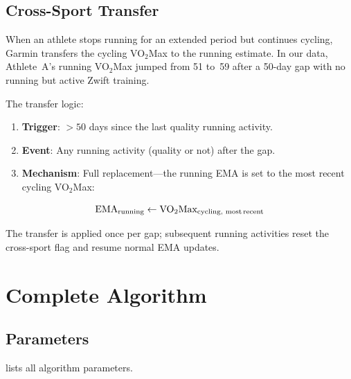 \documentclass[11pt,a4paper]{article}
\begin{document}
\subsection{Cross-Sport Transfer}
\label{sec:cross-sport}

When an athlete stops running for an extended period but continues cycling, Garmin transfers the cycling VO$_2$Max to the running estimate.
In our data, Athlete~A's running VO$_2$Max jumped from 51 to~59 after a 50-day gap with no running but active Zwift training.

The transfer logic:
\begin{enumerate}[nosep]
    \item \textbf{Trigger}: $> 50$ days since the last quality running activity.
    \item \textbf{Event}: Any running activity (quality or not) after the gap.
    \item \textbf{Mechanism}: Full replacement---the running EMA is set to the most recent cycling VO$_2$Max:
\end{enumerate}
\begin{equation}
\text{EMA}_{\text{running}} \leftarrow \text{VO}_2\text{Max}_{\text{cycling, most\,recent}}
\label{eq:cross-sport}
\end{equation}

The transfer is applied once per gap; subsequent running activities reset the cross-sport flag and resume normal EMA updates.


\section{Complete Algorithm}
\label{sec:algorithm}

\subsection{Parameters}

 lists all algorithm parameters.
\end{document}
